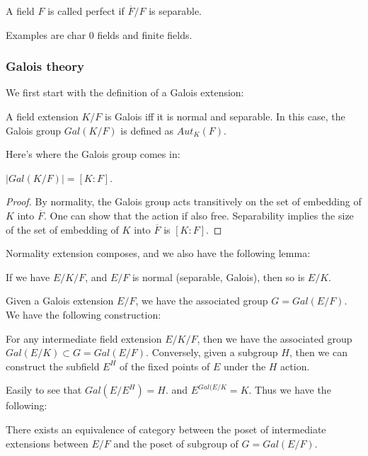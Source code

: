 \documentclass[main.tex]{subfiles}
\begin{document}
\begin{definition}
A field $F$ is called perfect if $\overline{F}/F$ is separable.
\end{definition}

Examples are char 0 fields and finite fields.


\subsubsection{Galois theory}
We first start with the definition of a Galois extension:

\begin{definition}
A field extension $K/F$ is Galois iff it is normal and separable. In this case, the Galois group $Gal(K/F)$ is defined as $Aut_K(F)$.
\end{definition}

Here's where the Galois group comes in:
\begin{lemma}
$|Gal(K/F)| = [K: F]$.
\end{lemma}

\begin{proof}
By normality, the Galois group acts transitively on the set of embedding of $K$ into $\overline{F}$. One can show that the action if also free. Separability implies the size of the set of embedding of $K$ into $\overline{F}$ is $[K:F]$.
\end{proof}

Normality extension composes, and we also have the following lemma:
\begin{lemma}
If we have $E/K/F$, and $E/F$ is normal (separable, Galois), then so is $E/K$.
\end{lemma}

Given a Galois extension $E/F$, we have the associated group $G = Gal(E/F)$. We have the following construction:

For any intermediate field extension $E/K/F$, then we have the associated group $Gal(E/K) \subset G = Gal(E/F)$. Conversely, given a subgroup $H$, then we can construct the subfield $E^H$ of the fixed points of $E$ under the $H$ action. 

Easily to see that $Gal(E/E^H) = H$. and $E^{Gal(E/K} = K$. Thus we have the following:

\begin{theorem}
There exists an equivalence of category between the poset of intermediate extensions between $E/F$ and the poset of subgroup of $G = Gal(E/F)$.
\end{theorem}
\end{document}
